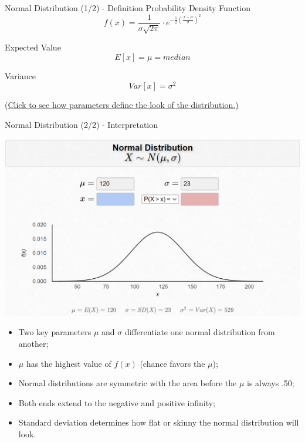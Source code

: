 \documentclass{beamer}
\begin{document}
\begin{frame}{Normal Distribution (1/2) - Definition}
Probability Density Function
$$ f(x) = \frac{1}{\sigma\sqrt{2\pi}} \cdot e^{-\frac{1}{2} \left(   \frac{x-\mu}{\sigma}\right)^2} $$

\vspace{0.3 cm}
Expected Value
$$ E[x] = \mu = median $$

Variance
$$ Var[x] = \sigma^2 $$

\begin{flushright}
\href{http://wentoday.com/wp/2020/10/06/normal-distribution-visualized-interactive/}{(Click to see how parameters define the look of the distribution.)}
\end{flushright}


\end{frame}


\begin{frame}{Normal Distribution (2/2) - Interpretation}

\begin{center}
\includegraphics[scale=0.4]{images/section4NormalDistIOWA.png}
\end{center}

\begin{scriptsize}

\begin{itemize}
\item Two key parameters $\mu$ and $\sigma$ differentiate one normal distribution from another; 
\item $\mu$ has the highest value of $f(x)$ (chance favors the $\mu$);
\item Normal distributions are symmetric with the area before the $\mu$ is always .50;
\item Both ends extend to the negative and positive infinity;
\item Standard deviation determines how flat or skinny the normal distribution will look.
\end{itemize}

\end{scriptsize}


\end{frame}
\end{document}
